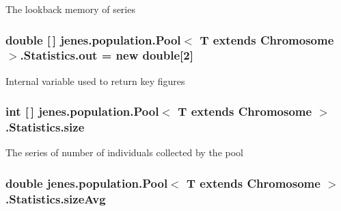 The lookback memory of series \hypertarget{classjenes_1_1population_1_1_pool_3_01_t_01extends_01_chromosome_01_4_1_1_statistics_a4f48b86d8217ee3ace0fb6f223ef2e88}{
\subsubsection[{out}]{\setlength{\rightskip}{0pt plus 5cm}double \mbox{[}$\,$\mbox{]} jenes.\-population.\-Pool$<$ T extends Chromosome $>$.Statistics.\-out = new double\mbox{[}2\mbox{]}\hspace{0.3cm}{\ttfamily [private]}}}\label{classjenes_1_1population_1_1_pool_3_01_t_01extends_01_chromosome_01_4_1_1_statistics_a4f48b86d8217ee3ace0fb6f223ef2e88}
Internal variable used to return key figures \hypertarget{classjenes_1_1population_1_1_pool_3_01_t_01extends_01_chromosome_01_4_1_1_statistics_a83b5eebc44597174091cc3918bd3be37}{
\subsubsection[{size}]{\setlength{\rightskip}{0pt plus 5cm}int \mbox{[}$\,$\mbox{]} jenes.\-population.\-Pool$<$ T extends Chromosome $>$.Statistics.\-size\hspace{0.3cm}{\ttfamily [private]}}}\label{classjenes_1_1population_1_1_pool_3_01_t_01extends_01_chromosome_01_4_1_1_statistics_a83b5eebc44597174091cc3918bd3be37}
The series of number of individuals collected by the pool \hypertarget{classjenes_1_1population_1_1_pool_3_01_t_01extends_01_chromosome_01_4_1_1_statistics_aa81a589bbb2658480c07be0c89c4ffb2}{
\subsubsection[{size\-Avg}]{\setlength{\rightskip}{0pt plus 5cm}double jenes.\-population.\-Pool$<$ T extends Chromosome $>$.Statistics.\-size\-Avg\hspace{0.3cm}{\ttfamily [private]}}}\label{classjenes_1_1population_1_1_pool_3_01_t_01extends_01_chromosome_01_4_1_1_statistics_aa81a589bbb2658480c07be0c89c4ffb2}
